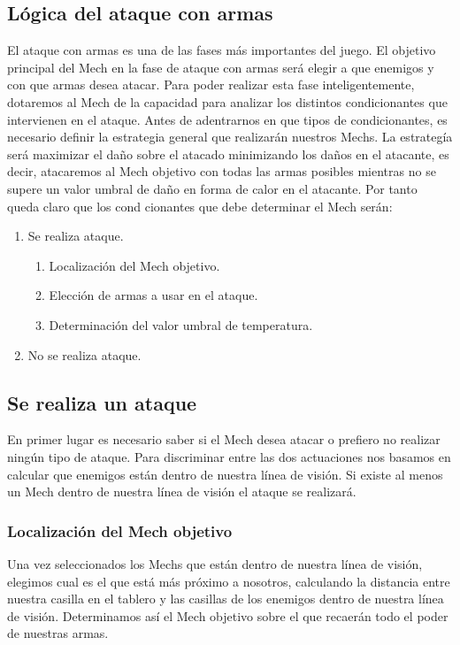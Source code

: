 \documentclass[a4paper,12pt,oneside]{book}
\begin{document}
\subsection{Lógica del ataque con armas}
El ataque con armas es una de las fases más importantes del juego.  El objetivo principal del Mech en la fase de ataque con armas será elegir a que enemigos y con que armas desea atacar.
Para poder realizar esta fase inteligentemente, dotaremos al Mech de la capacidad para analizar los distintos condicionantes que intervienen en el ataque. 
Antes de adentrarnos en que tipos de condicionantes, es necesario
definir la estrategia general que realizarán nuestros Mechs. La
estrategía será maximizar el daño sobre el atacado minimizando los
daños en el atacante, es decir, atacaremos al Mech objetivo con todas
las armas posibles mientras no se supere un valor umbral de daño en
forma de calor en el atacante. Por tanto queda claro que los cond
cionantes que debe determinar el Mech serán:
\begin{enumerate}
\item Se realiza ataque.
  \begin{enumerate}
  \item Localización del Mech objetivo.
  \item Elección de armas a usar en el ataque.
  \item Determinación del valor umbral de temperatura.
  \end{enumerate}
\item No se realiza ataque.
\end{enumerate}
\subsection{Se realiza un ataque}
En primer lugar es necesario saber si el Mech desea atacar o prefiero
no realizar ningún tipo de ataque. Para discriminar entre las dos
actuaciones nos basamos en calcular que enemigos están dentro de
nuestra línea de visión. Si existe al menos un Mech dentro de nuestra
línea de visión el ataque se realizará. 

\subsubsection{Localización del Mech objetivo}
Una vez seleccionados los Mechs que están dentro de nuestra línea de
visión, elegimos cual es el que está más próximo a nosotros,
calculando la distancia entre nuestra casilla en el tablero y las
casillas de los enemigos dentro de nuestra línea de
visión. Determinamos así el Mech objetivo sobre el que recaerán todo
el poder de nuestras armas.
\end{document}
